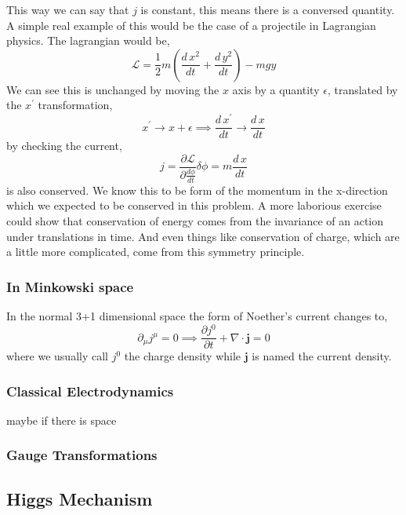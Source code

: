 This way we can say that $j$ is constant, this means there is a conversed quantity. A simple real example of this would be the case of a projectile in Lagrangian physics. The lagrangian would be,
\begin{equation}
\mathcal{L} = \frac{1}{2}m\left(\frac{d\,x^2}{dt} + \frac{d\,y^2}{dt}\right) - mgy  
\end{equation}
We can see this is unchanged by moving the $x$ axis by a quantity $\epsilon$, translated by the $x^\prime$ transformation,
\begin{equation}
x^\prime \longrightarrow x + \epsilon \implies \frac{d\,x^\prime}{dt} \longrightarrow \frac{d\,x}{dt}  
\end{equation}
by checking the current, 
\begin{equation}
j= \frac{ \partial \mathcal{L}}{ \partial \frac{d \phi}{dt}} \delta \phi = m \frac{d\,x}{dt}
\end{equation}
is also conserved. We know this to be form of the momentum in the x-direction which we expected to be conserved in this problem. A more laborious exercise could show that conservation of energy comes from the invariance of an action under translations in time. And even things like conservation of charge, which are a little more complicated, come from this symmetry principle. 

\subsubsection{In Minkowski space}

In the normal 3+1 dimensional space the form of Noether's current changes to, 
\begin{equation}
\partial_\mu j^\mu = 0 \implies \frac{ \partial j^0 }{\partial t} + \nabla \cdot \mathbf{j} = 0  
\end{equation}
where we usually call $j^0$ the charge density while $\mathbf{j}$ is named the current density. 

\subsubsection{Classical Electrodynamics}
maybe if there is space  

\subsubsection{Gauge Transformations}

\subsection{Higgs Mechanism}

